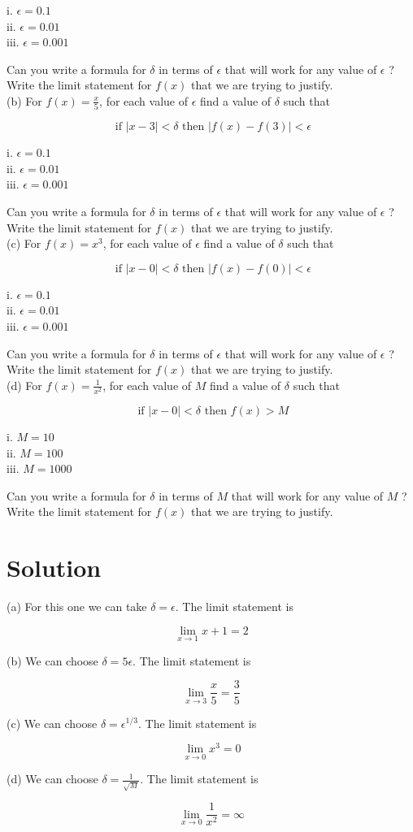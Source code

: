 \documentclass[10pt]{article}
\begin{document}
i. $\epsilon=0.1$\\
ii. $\epsilon=0.01$\\
iii. $\epsilon=0.001$

Can you write a formula for $\delta$ in terms of $\epsilon$ that will work for any value of $\epsilon$ ? Write the limit statement for $f(x)$ that we are trying to justify.\\
(b) For $f(x)=\frac{x}{5}$, for each value of $\epsilon$ find a value of $\delta$ such that

$$
\text { if }|x-3|<\delta \text { then }|f(x)-f(3)|<\epsilon
$$

i. $\epsilon=0.1$\\
ii. $\epsilon=0.01$\\
iii. $\epsilon=0.001$

Can you write a formula for $\delta$ in terms of $\epsilon$ that will work for any value of $\epsilon$ ? Write the limit statement for $f(x)$ that we are trying to justify.\\
(c) For $f(x)=x^{3}$, for each value of $\epsilon$ find a value of $\delta$ such that

$$
\text { if }|x-0|<\delta \text { then }|f(x)-f(0)|<\epsilon
$$

i. $\epsilon=0.1$\\
ii. $\epsilon=0.01$\\
iii. $\epsilon=0.001$

Can you write a formula for $\delta$ in terms of $\epsilon$ that will work for any value of $\epsilon$ ? Write the limit statement for $f(x)$ that we are trying to justify.\\
(d) For $f(x)=\frac{1}{x^{2}}$, for each value of $M$ find a value of $\delta$ such that

$$
\text { if }|x-0|<\delta \text { then } f(x)>M
$$

i. $M=10$\\
ii. $M=100$\\
iii. $M=1000$

Can you write a formula for $\delta$ in terms of $M$ that will work for any value of $M$ ?\\
Write the limit statement for $f(x)$ that we are trying to justify.

\section*{Solution}
(a) For this one we can take $\delta=\epsilon$. The limit statement is

$$
\lim _{x \rightarrow 1} x+1=2
$$

(b) We can choose $\delta=5 \epsilon$. The limit statement is

$$
\lim _{x \rightarrow 3} \frac{x}{5}=\frac{3}{5}
$$

(c) We can choose $\delta=\epsilon^{1 / 3}$. The limit statement is

$$
\lim _{x \rightarrow 0} x^{3}=0
$$

(d) We can choose $\delta=\frac{1}{\sqrt{M}}$. The limit statement is

$$
\lim _{x \rightarrow 0} \frac{1}{x^{2}}=\infty
$$
\end{document}
